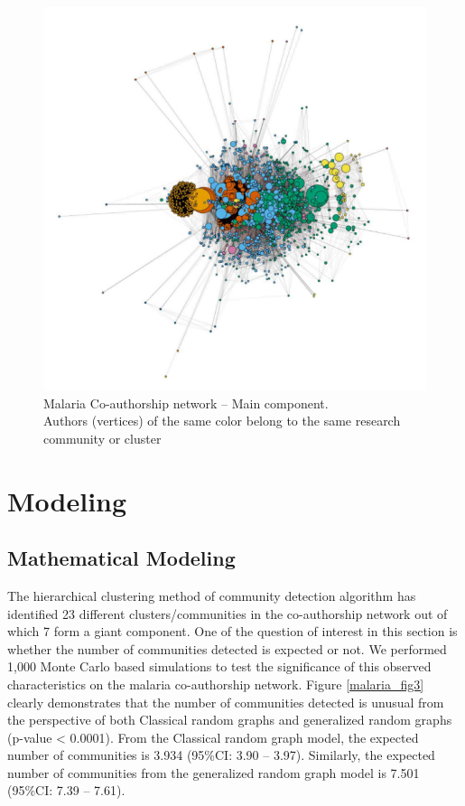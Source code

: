 \begin{figure}[!ht]
\centering
\hspace*{-1cm}
\includegraphics[scale=1]{Chapters/malaria/mnet}
\caption{Malaria Co-authorship network -- Main component. \\Authors (vertices) of the same color belong to the same research community or cluster}
\label{malaria_fig5}
\end{figure}

\section{Modeling}
\subsection{Mathematical Modeling}
The hierarchical clustering method of community detection algorithm has identified 23 different clusters/communities in the co-authorship network out of which 7 form a giant component. One of the question of interest in this section is whether the number of communities detected is expected or not. We performed 1,000 Monte Carlo based simulations to test the significance of this observed characteristics on the malaria co-authorship network. Figure \ref{malaria_fig3} clearly demonstrates that the number of communities detected is unusual from the perspective of both Classical random graphs and generalized random graphs (p-value < 0.0001). From the Classical random graph model, the expected number of communities is 3.934 (95\%CI: 3.90 -- 3.97). Similarly, the expected number of communities from the generalized random graph model is 7.501 (95\%CI: 7.39 -- 7.61).

